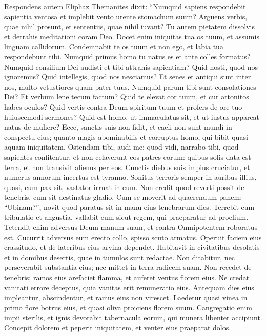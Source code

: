 \begin{biblechapter}  
\verse Respondens autem Eliphaz Themanites dixit: 
\verse “Numquid sapiens respondebit sapientia ventosa et implebit vento urente stomachum suum? 
\verse Arguens verbis, quae nihil prosunt, et sententiis, quae nihil iuvant? 
\verse Tu autem pietatem dissolvis et detrahis meditationi coram Deo. 
\verse Docet enim iniquitas tua os tuum, et assumis linguam callidorum. 
\verse Condemnabit te os tuum et non ego, et labia tua respondebunt tibi. 
\verse Numquid primus homo tu natus es et ante colles formatus? 
\verse Numquid consilium Dei audisti et tibi attrahis sapientiam? 
\verse Quid nosti, quod nos ignoremus? Quid intellegis, quod nos nesciamus? 
\verse Et senes et antiqui sunt inter nos, multo vetustiores quam pater tuus. 
\verse Numquid parum tibi sunt consolationes Dei? Et verbum lene tecum factum? 
\verse Quid te elevat cor tuum, et cur attonitos habes oculos? 
\verse Quid vertis contra Deum spiritum tuum et profers de ore tuo huiuscemodi sermones? 
\verse Quid est homo, ut immaculatus sit, et ut iustus appareat natus de muliere? 
\verse Ecce, sanctis suis non fidit, et caeli non sunt mundi in conspectu eius; 
\verse quanto magis abominabilis et corruptus homo, qui bibit quasi aquam iniquitatem. 
\verse Ostendam tibi, audi me; quod vidi, narrabo tibi, 
\verse quod sapientes confitentur, et non celaverunt eos patres eorum: 
\verse quibus solis data est terra, et non transivit alienus per eos. 
\verse Cunctis diebus suis impius cruciatur, et numerus annorum incertus est tyranno. 
\verse Sonitus terroris semper in auribus illius, quasi, cum pax sit, vastator irruat in eum. 
\verse Non credit quod reverti possit de tenebris, cum sit destinatus gladio. 
\verse Cum se moverit ad quaerendum panem: “Ubinam?”, novit quod paratus sit in manu eius tenebrarum dies. 
\verse Terrebit eum tribulatio et angustia, vallabit eum sicut regem, qui praeparatur ad proelium. 
\verse Tetendit enim adversus Deum manum suam, et contra Omnipotentem roboratus est. 
\verse Cucurrit adversus eum erecto collo, spisso scuto armatus. 
\verse Operuit faciem eius crassitudo, et de lateribus eius arvina dependet. 
\verse Habitavit in civitatibus desolatis et in domibus desertis, quae in tumulos sunt redactae. 
\verse Non ditabitur, nec perseverabit substantia eius; nec mittet in terra radicem suam. 
\verse Non recedet de tenebris; ramos eius arefaciet flamma, et auferet ventus florem eius. 
\verse Ne credat vanitati errore deceptus, quia vanitas erit remuneratio eius. 
\verse Antequam dies eius impleantur, abscindentur, et ramus eius non virescet. 
\verse Laedetur quasi vinea in primo flore botrus eius, et quasi oliva proiciens florem suum. 
\verse Cangregatio enim impii sterilis, et ignis devorabit tabernacula eorum, qui munera libenter accipiunt. 
\verse Concepit dolorem et peperit iniquitatem, et venter eius praeparat dolos. 
\end{biblechapter}

